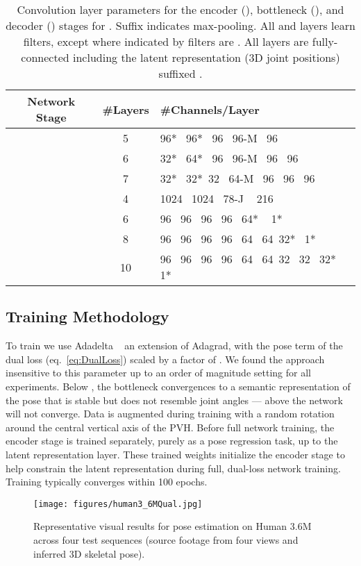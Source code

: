\documentclass[runningheads]{llncs}
\begin{document}
\begin{table}[t!]
\centering
{
\small
\begin{tabular}{ccl}
\hline
Network Stage   &  \#Layers & \#Channels/Layer \\
\hline
 & 5 & 96*~ 96*~  96~ 96-M~ 96\\
 & 6 & 32*~ 64*~ 96~ 96-M~ 96~ 96\\
 & 7 & 32*~ 32*~32~ 64-M~ 96~ 96~ 96 \\
\hline
 & 4 & 1024~ 1024~ 78-J ~ 216 \\
\hline
 & 6 & 96~ 96~ 96~ 96~ 64* ~ 1*\\
 & 8 & 96~ 96~ 96~ 96~ 64~ 64~32*~ 1*\\
 & 10 & 96~ 96~ 96~ 96~ 64~ 64~32~ 32~ 32*~ 1*\\
\hline
\end{tabular}
}
\caption{Convolution layer parameters for the encoder (), bottleneck (), and decoder () stages for .  Suffix  indicates max-pooling. All  and  layers learn  filters, except where indicated by  filters are . All  layers are fully-connected including the latent representation (3D joint positions) suffixed .}
\label{tbl:netparams}
\squeezeup
\squeezeup
\end{table}

\subsection {Training Methodology}
\label{sec:train}

To train  we use Adadelta ~\cite{zeiler2012adadelta} an extension of Adagrad, with the pose term of the dual loss (eq.~\ref{eq:DualLoss}) scaled by a factor of . We found the approach insensitive to this parameter up to an order of magnitude setting  for all experiments. Below , the bottleneck convergences to a semantic representation of the pose that is stable but does not resemble joint angles --- above  the network will not converge. Data is augmented during training with a random rotation around the central vertical axis of the PVH. Before full network training, the encoder stage is trained separately, purely as a pose regression task, up to the latent representation layer. These trained weights initialize the encoder stage to help constrain the latent representation during full, dual-loss network training. Training typically converges within 100 epochs.
\begin{figure}[htb]
\centering
\texttt{[image: figures/human3\_6MQual.jpg]}
\caption{Representative visual results for pose estimation on Human 3.6M across four test sequences (source footage from four views and inferred 3D skeletal pose). }
\label{fig:Human36MQual}
\end{figure}
\end{document}
